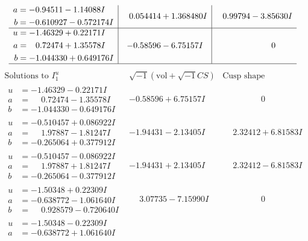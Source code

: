 \documentclass[1p]{elsarticle_modified}
\theoremstyle{definition}
\newcommand{\I}{\sqrt{-1}}
\begin{document}
$$\begin{array}{c|c|c}
\begin{aligned}
a &= -0.94511 - 1.14088 I \\
b &= -0.610927 - 0.572174 I\end{aligned}
 & \phantom{-}0.054414 + 1.368480 I & \phantom{-}0.99794 - 3.85630 I \\ \hline\begin{aligned}
u &= -1.46329 + 0.22171 I \\
a &= \phantom{-}0.72474 + 1.35578 I \\
b &= -1.044330 + 0.649176 I\end{aligned}
 & -0.58596 - 6.75157 I & \phantom{-0.000000 } 0\\
 \hline 
 \end{array}$$\newpage$$\begin{array}{c|c|c}  
\text{Solutions to }I^u_{1}& \I (\text{vol} + \sqrt{-1}CS) & \text{Cusp shape}\\
 \hline 
\begin{aligned}
u &= -1.46329 - 0.22171 I \\
a &= \phantom{-}0.72474 - 1.35578 I \\
b &= -1.044330 - 0.649176 I\end{aligned}
 & -0.58596 + 6.75157 I & \phantom{-0.000000 } 0 \\ \hline\begin{aligned}
u &= -0.510457 + 0.086922 I \\
a &= \phantom{-}1.97887 - 1.81247 I \\
b &= -0.265064 + 0.377912 I\end{aligned}
 & -1.94431 - 2.13405 I & \phantom{-}2.32412 + 6.81583 I \\ \hline\begin{aligned}
u &= -0.510457 - 0.086922 I \\
a &= \phantom{-}1.97887 + 1.81247 I \\
b &= -0.265064 - 0.377912 I\end{aligned}
 & -1.94431 + 2.13405 I & \phantom{-}2.32412 - 6.81583 I \\ \hline\begin{aligned}
u &= -1.50348 + 0.22309 I \\
a &= -0.638772 - 1.061640 I \\
b &= \phantom{-}0.928579 - 0.720640 I\end{aligned}
 & \phantom{-}3.07735 - 7.15990 I & \phantom{-0.000000 } 0 \\ \hline\begin{aligned}
u &= -1.50348 - 0.22309 I \\
a &= -0.638772 + 1.061640 I \\

\end{aligned}
\end{array}$$
\end{document}
